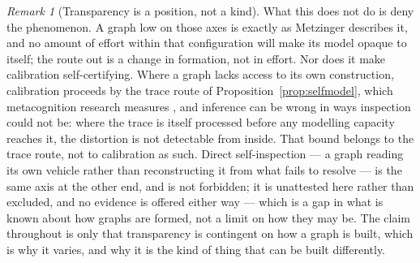\documentclass[11pt,a4paper]{article}
\theoremstyle{remark}\newtheorem{remark}[definition]{Remark}
\begin{document}
\begin{remark}[Transparency is a position, not a kind]
What this does not do is deny the phenomenon. A graph low on those axes is exactly as
Metzinger describes it, and no amount of effort within that configuration will make its model
opaque to itself; the route out is a change in formation, not in effort. Nor does it make
calibration self-certifying. Where a graph lacks access to its own construction, calibration
proceeds by the trace route of Proposition~\ref{prop:selfmodel}, which metacognition
research measures \citep{fleming2024}, and inference can be wrong in ways inspection could not be:
where the trace is itself processed before any modelling capacity reaches it, the distortion is
not detectable from inside. That bound belongs to the trace route, not to calibration as such.
Direct self-inspection --- a graph reading its own vehicle rather than reconstructing it from
what fails to resolve --- is the same axis at the other end, and is not forbidden; it is unattested here rather than excluded, and no evidence
is offered either way --- which is a gap in what is known about how graphs are formed, not a limit
on how they may be. The claim throughout is only that transparency is contingent on
how a graph is built, which is why it varies, and why it is the kind of thing that can be built
differently.
\end{remark}
\end{document}
